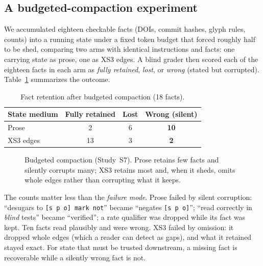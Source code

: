 \documentclass[conference]{IEEEtran}
\newcommand{\code}[1]{\texttt{#1}}
\begin{document}
\subsection{A budgeted-compaction experiment}
We accumulated eighteen checkable facts (DOIs, commit hashes, glyph rules,
counts) into a running state under a fixed token budget that forced roughly half
to be shed, comparing two arms with identical instructions and facts: one
carrying state as prose, one as XS3 edges. A blind grader then scored each of the
eighteen facts in each arm as \emph{fully retained}, \emph{lost}, or
\emph{wrong} (stated but corrupted). Table~\ref{tab:drift} summarizes the outcome.

\begin{table}[t]
\caption{Fact retention after budgeted compaction (18 facts).}
\label{tab:drift}
\centering
\begin{tabular}{lccc}
\toprule
State medium & Fully retained & Lost & \textbf{Wrong (silent)} \\
\midrule
Prose        & 2  & 6 & \textbf{10} \\
XS3 edges    & 13 & 3 & \textbf{2} \\
\bottomrule
\end{tabular}
\end{table}

\begin{figure}[t]
\centering
{}
\caption{Budgeted compaction (Study~S7). Prose retains few facts and silently
corrupts many; XS3 retains most and, when it sheds, omits whole edges rather than
corrupting what it keeps.}
\label{fig:drift}
\end{figure}

The counts matter less than the \emph{failure mode}. Prose failed by silent
corruption: ``desugars to \code{[s p o] mark not}'' became ``negates
\code{[s p o]}''; ``read correctly in \emph{blind} tests'' became ``verified'';
a rate qualifier was dropped while its fact was kept. Ten facts read plausibly
and were wrong. XS3 failed by omission: it dropped whole edges (which a reader
can detect as gaps), and what it retained stayed exact. For state that must be
trusted downstream, a missing fact is recoverable while a silently wrong fact is
not.
\end{document}
